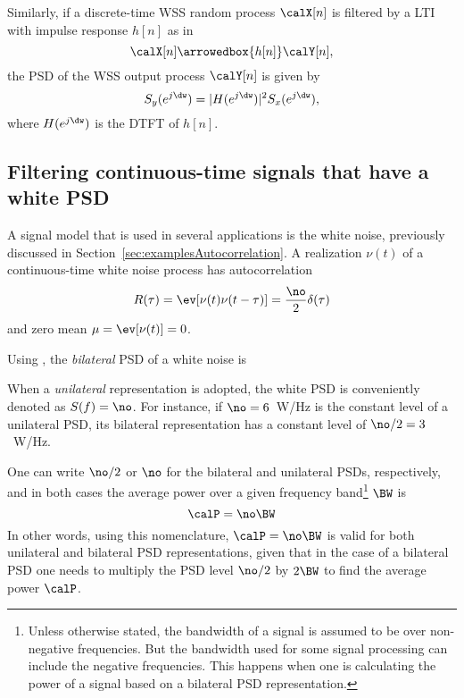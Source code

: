 Similarly, if a discrete-time WSS random process $\calX[n]$ is filtered by a LTI with impulse response $h[n]$ as in
\[
\calX[n] \arrowedbox{h[n]}  \calY[n],
\]
the PSD of the WSS output process $\calY[n]$ is given by
\begin{equation}
S_y(e^{j \dw}) = |H(e^{j \dw})|^2 S_x(e^{j \dw}),
\label{eq:discrete_filtered_wss}
\end{equation}
where $H(e^{j \dw})$ is the DTFT of $h[n]$.

\subsection{Filtering continuous-time signals that have a white PSD}
\label{sec:ctWhitePSD}

A signal model that is used in several applications is the white noise, previously discussed in Section~\ref{sec:examplesAutocorrelation}.
A realization $\nu(t)$ of a continuous-time white noise process has autocorrelation
\begin{equation}
R(\tau)=\ev[\nu(t) \nu(t-\tau)]=\frac \no 2 \delta(\tau)
\label{eq:awgnAutocorrelation}
\end{equation}
and zero mean $\mu = \ev[\nu(t)]=0$.

Using , the \emph{bilateral} PSD of a white noise is 

When a \emph{unilateral} representation is adopted, the white PSD is conveniently denoted as $S(f) = \no$. For instance, if $\no=6$~W/Hz is the constant level of a unilateral PSD, its bilateral representation has a constant level of $\no/2 = 3$~W/Hz.

One can write $\no/2$ or $\no$ for the bilateral and unilateral PSDs, respectively, and in both cases the average power over a given frequency band\footnote{Unless otherwise stated, the bandwidth of a signal is assumed to be over non-negative frequencies. But the bandwidth used for some signal processing can include the negative frequencies. This happens when one is calculating
the power of a signal based on a bilateral PSD representation.} $\BW$ is 
\begin{equation}
\calP = \no \BW
\end{equation}
In other words, using this nomenclature, $\calP = \no \BW$ is valid for both unilateral and bilateral PSD representations, given that in the case of a bilateral PSD one needs to multiply the PSD level $\no/2$ by $2 \BW$ to find the average power $\calP$.

